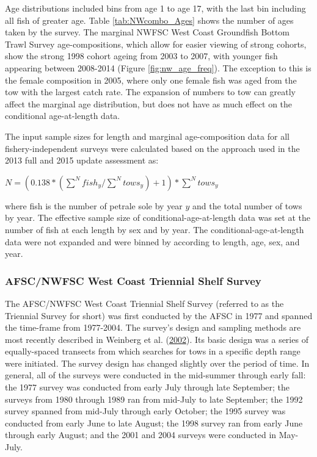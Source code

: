 \documentclass[12pt,]{article}
\begin{document}
Age distributions included bins from age 1 to age 17, with the last bin
including all fish of greater age. Table \ref{tab:NWcombo_Ages} shows
the number of ages taken by the survey. The marginal NWFSC West Coast
Groundfish Bottom Trawl Survey age-compositions, which allow for easier
viewing of strong cohorts, show the strong 1998 cohort ageing from 2003
to 2007, with younger fish appearing between 2008-2014 (Figure
\ref{fig:nw_age_freq}). The exception to this is the female composition
in 2005, where only one female fish was aged from the tow with the
largest catch rate. The expansion of numbers to tow can greatly affect
the marginal age distribution, but does not have as much effect on the
conditional age-at-length data.

The input sample sizes for length and marginal age-composition data for
all fishery-independent surveys were calculated based on the approach
used in the 2013 full and 2015 update assessment as:

\begin{centering}

$N = (0.138*(\sum_{}^{N} fish_{y} / \sum_{}^N tows_{y}) + 1)*\sum_{}^N tows_y$ 

\end{centering}

where fish is the number of petrale sole by year \(y\) and the total
number of tows by year. The effective sample size of
conditional-age-at-length data was set at the number of fish at each
length by sex and by year. The conditional-age-at-length data were not
expanded and were binned by according to length, age, sex, and year.

\subsubsection{AFSC/NWFSC West Coast Triennial Shelf
Survey}\label{afscnwfsc-west-coast-triennial-shelf-survey}

The AFSC/NWFSC West Coast Triennial Shelf Survey (referred to as the
Triennial Survey for short) was first conducted by the AFSC in 1977 and
spanned the time-frame from 1977-2004. The survey's design and sampling
methods are most recently described in Weinberg et al.
(\protect\hyperlink{ref-weinberg_2001_2002}{2002}). Its basic design was
a series of equally-spaced transects from which searches for tows in a
specific depth range were initiated. The survey design has changed
slightly over the period of time. In general, all of the surveys were
conducted in the mid-summer through early fall: the 1977 survey was
conducted from early July through late September; the surveys from 1980
through 1989 ran from mid-July to late September; the 1992 survey
spanned from mid-July through early October; the 1995 survey was
conducted from early June to late August; the 1998 survey ran from early
June through early August; and the 2001 and 2004 surveys were conducted
in May-July.
\end{document}
